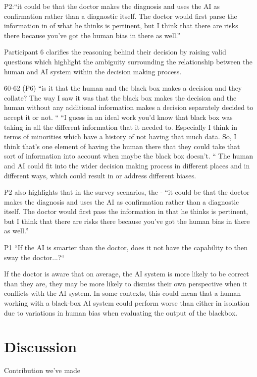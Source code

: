 \documentclass[manuscript,screen,review]{acmart}
\begin{document}
P2:“it could be that the doctor makes the diagnosis and uses the AI as confirmation rather than a diagnostic itself. The doctor would first parse the information in of what he thinks is pertinent, but I think that there are risks there because you’ve got the human bias in there as well.”

Participant 6 clarifies the reasoning behind their decision by raising valid questions which highlight the ambiguity surrounding the relationship between the  human and AI system within the decision making process.

60-62 (P6)
“is it that the human and the black box makes a decision and they collate? The way I saw it was that the black box makes the decision and the human without any additional information makes a decision separately decided to accept it or not. “
“I guess in an ideal work you'd know that black box was taking in all the different information that it needed to. Especially I think in terms of minorities which have a history of not having that much data. So, I think that’s one element of having the human there that they could take that sort of information into account when maybe the black box doesn’t. “
The human and AI could fit into the wider decision making process in different places and in different ways, which could result in or address different biases.

P2 also highlights that in the survey scenarios, the  - “it could be that the doctor makes the diagnosis and uses the AI as confirmation rather than a diagnostic itself. The doctor would first pass the information in that he thinks is pertinent, but I think that there are risks there because you’ve got the human bias in there as well.”

P1 “If the AI is smarter than the doctor, does it not have the capability to then sway the doctor...?“

If the doctor is aware that on average, the AI system is more likely to be correct than they are, they may be more likely to dismiss their own perspective when it conflicts with the AI system. In some contexts, this could mean that a human working with a black-box AI system could perform worse than either in isolation due to variations in human bias when evaluating the output of the blackbox. 





\newpage
\section{Discussion}
Contribution we've made
\end{document}
